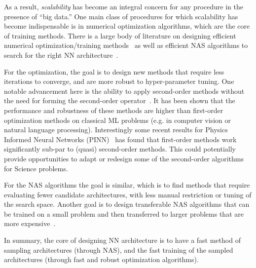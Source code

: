 As a result, \emph{scalability} has become an integral concern for any procedure in the presence of ``big data.'' 
One main class of procedures for which scalability has become indispensable is in
numerical optimization algorithms, which are the core of training methods. 
There is a large body of literature on designing
efficient  numerical optimization/training methods~\cite{reddi2018adaptive,shazeer2018adafactor,zhang2019lookahead,park2020lookahead,zhuang2020adabelief,liu2020variance,ginsburg2020stochastic,yao2020adahessian,ma2020apollo,gupta2018shampoo} as well as efficient NAS algorithms to 
search for the right NN architecture~\cite{zoph2016neural,pham2018efficient,tan2019mnasnet,liu2018darts,wu2019fbnet}.

For the optimization, the goal is to design new methods that require less iterations to converge, and are
more robust to hyper-parameter tuning.
One notable advancement here is the ability to apply second-order methods
without the need for forming the second-order operator~\cite{yao2020adahessian,yao2019pyhessian,gupta2018shampoo,reddi2018adaptive}.
It has been shown that the performance and robustness of these methods are higher than
first-order optimization methods on classical ML problems (e.g. in computer vision or natural language processing).
Interestingly some recent results for Physics Informed Neural Networks (PINN)~\cite{raissi2019physics} has
found that first-order methods work significantly sub-par to (quasi) second-order methods.
This could potentially provide opportunities to adapt or redesign some of the second-order algorithms for Science problems.

For the NAS algorithms the goal is similar, which is to find methods
that require evaluating fewer candidate architectures, with less manual restriction or tuning
of the search space.
Another goal is to design transferable NAS algorithms that can be trained on a small problem
and then transferred to larger problems that are more expensive~\cite{cai2018proxylessnas,cai2019once}.

In summary, the core of designing NN architecture is to have a fast method of sampling architectures (through NAS),
and the fast training of the sampled architectures (through fast and robust optimization algorithms).




